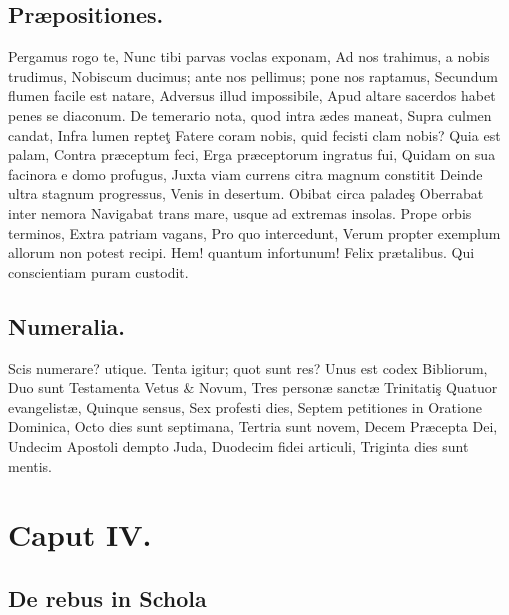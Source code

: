 \documentclass{book}
\begin{document}
\section{Præpositiones.}

Pergamus rogo te,
Nunc tibi parvas voclas exponam,
Ad nos trahimus, a nobis trudimus,
Nobiscum ducimus; ante nos pellimus; pone nos raptamus,
Secundum flumen facile est natare,
Adversus illud impossibile,
Apud altare sacerdos habet penes se diaconum.
De temerario nota, quod intra ædes maneat,
Supra culmen candat,
Infra lumen repteţ
Fatere coram nobis, quid fecisti clam nobis?
Quia est palam,
Contra præceptum feci,
Erga præceptorum ingratus fui,
Quidam on sua facinora e domo profugus,
Juxta viam currens citra magnum constitit
Deinde ultra stagnum progressus,
Venis in desertum.
Obibat circa paladeş
Oberrabat inter nemora
Navigabat trans mare, usque ad extremas insolas.
Prope orbis terminos,
Extra patriam vagans,
Pro quo intercedunt,
Verum propter exemplum allorum non potest recipi.
Hem! quantum infortunum!
Felix prætalibus.
Qui conscientiam puram custodit.

\section{Numeralia.}

Scis numerare? utique.
Tenta igitur; quot sunt res?
Unus est codex Bibliorum,
Duo sunt Testamenta Vetus & Novum,
Tres personæ sanctæ Trinitatiş
Quatuor evangelistæ,
Quinque sensus,
Sex profesti dies,
Septem petitiones in Oratione Dominica,
Octo dies sunt septimana,
Tertria sunt novem,
Decem Præcepta Dei,
Undecim Apostoli dempto Juda,
Duodecim fidei articuli,
Triginta dies sunt mentis.

\chapter{Caput IV.}

\section{De rebus in Schola}
\end{document}
